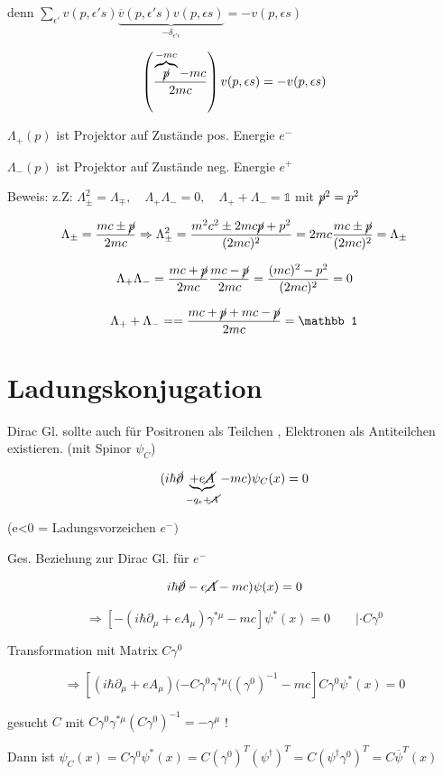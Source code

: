 denn \(\sum_{\epsilon'} v(p,\epsilon' s)\underbrace{\overline v (p,\epsilon' s) v(p,\epsilon s)}_{-\delta_{\epsilon'\epsilon}} = -v(p,\epsilon s)\)

\[ \left(\frac{\overbrace{\cancel p}^{-mc} -mc}{2mc}\right) v(p,\epsilon s) = -v(p,\epsilon s) \]


\(\Lambda_+(p)\) ist Projektor auf Zustände pos. Energie \(e^-\)

\(\Lambda_-(p)\) ist Projektor auf Zustände neg. Energie \(e^+\)

Beweis: z.Z: \(\Lambda^2_{\pm}=\Lambda_\mp,\quad \Lambda_+\Lambda_- = 0,\quad \Lambda_++\Lambda_- = \mathbb 1\) mit \(\cancel p^2 = p^2\)

\[ \Lambda_{\pm} = \frac{mc\pm \cancel p}{2mc} \Rightarrow \Lambda^2_{\pm} = \frac{m^2c^2\pm 2mc\cancel p+p^2}{(2mc)^2} = 2mc \frac{mc\pm \cancel p}{(2mc)^2} = \Lambda_\pm\]


\[ \Lambda_+\Lambda_- = \frac{mc+\cancel p}{2mc}\frac{mc-\cancel p}{2mc} = \frac{(mc)^2-p^2}{(2mc)^2} = 0 \]

\[ \Lambda_++\Lambda_- = = \frac{mc+\cancel p + mc - \cancel p}{2mc} = \mathbb 1 \]


\section{Ladungskonjugation}

Dirac Gl. sollte auch für Positronen als Teilchen , Elektronen als Antiteilchen existieren. (mit Spinor \(\psi_C\))

\[(i\hbar \cancel \partial\underbrace{+e\cancel A}_{-q_e+\cancel A}-mc)\psi_C(x) = 0\]

(e<0 = Ladungsvorzeichen \(e^-)\)

Ges. Beziehung zur Dirac Gl. für \(e^-\)

\[ i\hbar\cancel \partial - e\cancel A - mc)\psi(x) = 0 \]

\[\Rightarrow [-(i\hbar\partial_\mu+eA_\mu)\gamma^{*\mu} - mc]\psi^*(x) = 0\qquad |\cdot C\gamma^0\]

Transformation mit Matrix \(C\gamma^0\)

\[\Rightarrow  [(i\hbar\partial_\mu+eA_\mu)(-C\gamma^0\gamma^{*\mu}((\gamma^0)^{-1} - mc]C\gamma^0\psi^*(x) = 0  \]


gesucht \(C\) mit \( C\gamma^0\gamma^{*\mu} (C\gamma^0)^{-1} = -\gamma^\mu\) !

Dann ist \(\psi_C (x) = C\gamma^0\psi^*(x) = C(\gamma^0)^T(\psi^\dagger)^T = C(\psi^\dagger\gamma^0)^T = C\overline \psi^T(x)\)

